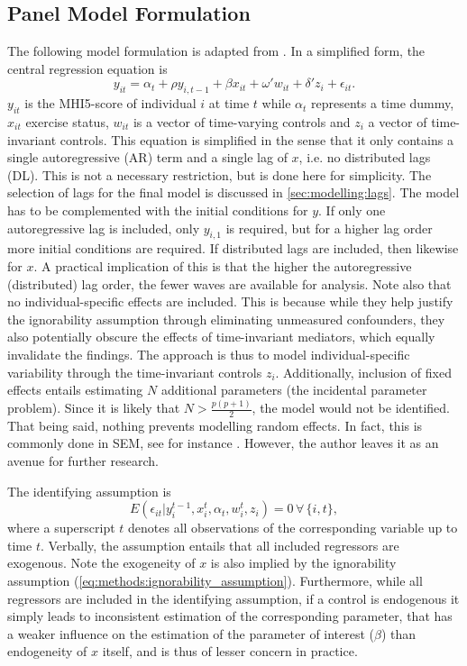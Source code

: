 \subsection{Panel Model Formulation}
\label{sec:methods:model_formulation}
The following model formulation is adapted from .
In a simplified form, the central regression equation is
\begin{equation}
    \label{eq:methods:model_formulation}
    y_{it} = \alpha_t + \rho y_{i,t-1} + \beta x_{it} + \omega' w_{it} + \delta' z_i + \epsilon_{it}.
\end{equation}
$y_{it}$ is the MHI5-score of individual $i$ at time $t$ while $\alpha_t$ represents a time dummy,
$x_{it}$ exercise status, $w_{it}$ is a vector of time-varying controls and $z_i$ a vector of time-invariant controls.
This equation is simplified in the sense that it only contains a single autoregressive (AR) term and a single lag of $x$,
i.e. no distributed lags (DL). This is not a necessary restriction, but is done here for simplicity.
The selection of lags for the final model is discussed in \cref{sec:modelling:lags}. The model has to be complemented
with the initial conditions for $y$. If only one autoregressive lag is included, only $y_{i,1}$ is required,
but for a higher lag order more initial conditions are required. If distributed lags are included, then likewise for $x$.
A practical implication of this is that the higher the autoregressive (distributed) lag order, the fewer waves
are available for analysis.
Note also that no individual-specific effects are included. This is because while they help justify the ignorability
assumption through eliminating unmeasured confounders, they also potentially obscure the effects of time-invariant mediators,
which equally invalidate the findings. The approach is thus to model individual-specific variability through the
time-invariant controls $z_i$. Additionally, inclusion of fixed effects entails estimating $N$ additional parameters
(the incidental parameter problem). Since it is likely that $N > \frac{p(p + 1)}{2}$, the model would not be identified.
That being said, nothing prevents modelling random effects. In fact, this is commonly done in
SEM, see for instance . However, the author leaves it as an avenue for further research.

The identifying assumption is \cite{moral2019dynamic}
\begin{equation}
    \label{eq:methods:identifying_assumption}
    E(\epsilon_{it} | y_i^{t-1}, x_i^t, \alpha_t, w_{i}^t, z_i) = 0 \,\forall\,\{i,t\},
\end{equation}
where a superscript $t$ denotes all observations of the corresponding variable up to time $t$.
Verbally, the assumption entails that all included regressors are exogenous.
Note the exogeneity of $x$ is also implied by the ignorability assumption (\cref{eq:methods:ignorability_assumption}).
Furthermore, while all regressors are included in the identifying assumption, if a control is endogenous it simply
leads to inconsistent estimation of the corresponding parameter, that has a weaker influence on the estimation
of the parameter of interest ($\beta$) than endogeneity of $x$ itself, and is thus of lesser concern in practice.

